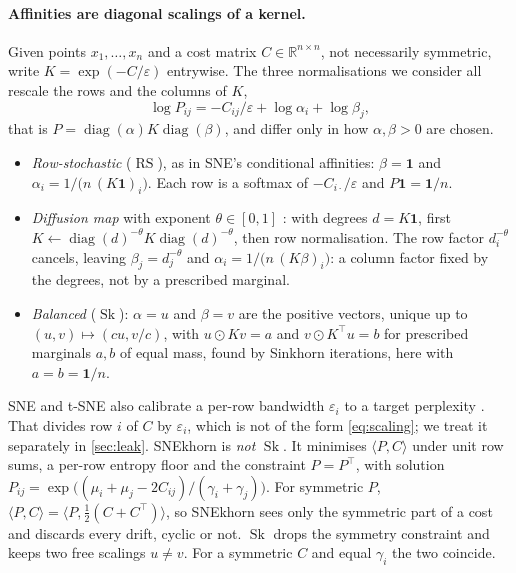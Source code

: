 \documentclass{article}
\theoremstyle{plain}
\theoremstyle{definition}
\theoremstyle{remark}
\newcommand{\R}{\mathbb{R}}
\newcommand{\eps}{\varepsilon}
\newcommand{\1}{\mathbf{1}}
\newcommand{\diag}{\operatorname{diag}}
\newcommand{\Sk}{\operatorname{Sk}}
\newcommand{\RS}{\operatorname{RS}}
\begin{document}
\paragraph{Affinities are diagonal scalings of a kernel.}
Given points $x_1,\dots,x_n$ and a cost matrix $C\in\R^{n\times n}$, not
necessarily symmetric, write $K=\exp(-C/\eps)$ entrywise. The three
normalisations we consider all rescale the rows and the columns of $K$,
\begin{equation}
  \log P_{ij}=-C_{ij}/\eps+\log\alpha_i+\log\beta_j ,
  \label{eq:scaling}
\end{equation}
that is $P=\diag(\alpha)K\diag(\beta)$,
and differ only in how $\alpha,\beta>0$ are chosen.
\begin{itemize}
  \item \emph{Row-stochastic} ($\RS$), as in SNE's conditional affinities:
    $\beta=\1$ and $\alpha_i=1/\big(n\,(K\1)_i\big)$. Each row is a
    softmax of $-C_{i\cdot}/\eps$ and $P\1=\1/n$.
  \item \emph{Diffusion map} with exponent $\theta\in[0,1]$
    \citep{coifman2006diffusion}: with degrees $d=K\1$, first
    $K\leftarrow\diag(d)^{-\theta}K\diag(d)^{-\theta}$, then row
    normalisation. The row factor $d_i^{-\theta}$ cancels, leaving
    $\beta_j=d_j^{-\theta}$ and $\alpha_i=1/\big(n\,(K\beta)_i\big)$:
    a column factor fixed by the degrees, not by a prescribed marginal.
  \item \emph{Balanced} ($\Sk$): $\alpha=u$ and $\beta=v$ are the
    positive vectors, unique up to $(u,v)\mapsto(cu,v/c)$, with
    $u\odot Kv=a$ and $v\odot K^\top u=b$ for prescribed marginals $a,b$
    of equal mass, found by Sinkhorn iterations, here with $a=b=\1/n$.
\end{itemize}
SNE and t-SNE also calibrate a per-row bandwidth $\eps_i$ to a target
perplexity \citep{vladymyrov2013entropic}. That divides row $i$ of $C$ by
$\eps_i$, which is not of the form \eqref{eq:scaling}; we treat it
separately in \cref{sec:leak}.
SNEkhorn \citep{vanassel2023snekhorn} is \emph{not} $\Sk$. It minimises
$\langle P,C\rangle$ under unit row sums, a per-row entropy floor and the
constraint $P=P^\top$, with solution
$P_{ij}=\exp\big((\mu_i+\mu_j-2C_{ij})/(\gamma_i+\gamma_j)\big)$. For
symmetric $P$, $\langle P,C\rangle=\langle P,\tfrac12(C+C^\top)\rangle$, so
SNEkhorn sees only the symmetric part of a cost and discards every drift,
cyclic or not. $\Sk$ drops the symmetry constraint and keeps two free
scalings $u\neq v$. For a symmetric $C$ and equal $\gamma_i$ the two
coincide.
\end{document}
